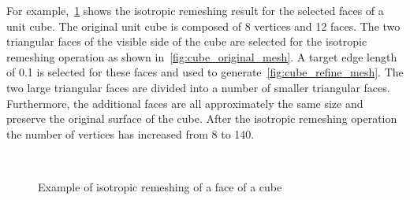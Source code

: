 For example,~\cref{fig:cube_remesh} shows the isotropic remeshing result for the selected faces of a unit cube.
The original unit cube is composed of \num{8} vertices and \num{12} faces.
The two triangular faces of the visible side of the cube are selected for the isotropic remeshing operation as shown in~\cref{fig:cube_original_mesh}.
A target edge length of \num{0.1} is selected for these faces and used to generate~\cref{fig:cube_refine_mesh}.
The two large triangular faces are divided into a number of smaller triangular faces.
Furthermore, the additional faces are all approximately the same size and preserve the original surface of the cube.
After the isotropic remeshing operation the number of vertices has increased from \num{8} to \num{140}.
\begin{figure}[htbp]
    \centering
    ~
    \caption{Example of isotropic remeshing of a face of a cube\label{fig:cube_remesh}}
\end{figure}

